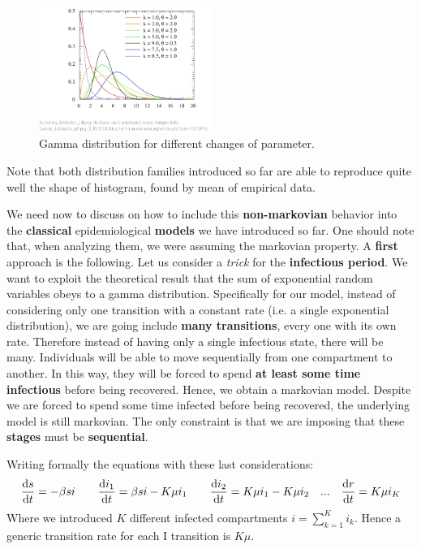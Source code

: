 \documentclass[../main/main.tex]{subfiles}
\begin{document}
\begin{figure}[h!]
\centering
\includegraphics[width=0.5\textwidth]{../lessons/image/09/image05.png}
\caption{\label{fig:09_5} Gamma distribution for different changes of parameter. }
\end{figure}

Note that both distribution families introduced so far are able to reproduce quite well the shape of histogram, found by mean of empirical data.

We need now to discuss on how to include this \textbf{non-markovian} behavior into the \textbf{classical} epidemiological \textbf{models} we have introduced so far. One should note that, when analyzing them, we were assuming the markovian property.
A \textbf{first} approach is the following. Let us consider a \textit{trick} for the \textbf{infectious period}. We want to exploit the theoretical result that the sum of exponential random variables obeys to a gamma distribution. Specifically for our model, instead of considering only one transition with a constant rate (i.e. a single exponential distribution), we are going include \textbf{many transitions}, every one with its own rate. Therefore instead of having only a single infectious state, there will be many. Individuals will be able to move sequentially from one compartment to another. In this way, they will be forced to spend \textbf{at least some time infectious} before being recovered. Hence, we obtain a markovian model. Despite we are forced to spend some time infected before being recovered, the underlying model is still markovian. The only constraint is that we are imposing that these \textbf{stages} must be \textbf{sequential}.


Writing formally the equations with these last considerations:
\begin{equation*}
    \dv{s}{t} = -\beta s i \qquad \dv{i_1}{t} = \beta s i - K \mu i_1 \qquad \dv{i_2}{t} = K \mu i_1 - K \mu i_2 \quad ... \quad \dv{r}{t} = K \mu i_K
\end{equation*}
Where we introduced $K$ different infected compartments $ i = \sum_{k=1}^K i_k$. Hence a generic transition rate for each I transition is \( K \mu  \). 
\end{document}
